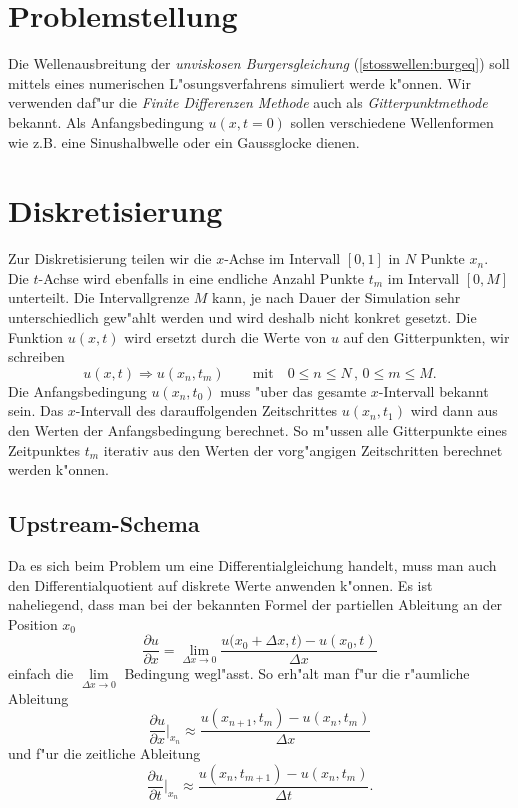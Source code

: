 \begin{refsection}
\section{Problemstellung}
Die Wellenausbreitung der \textit{unviskosen Burgersgleichung}
(\ref{stosswellen:burgeq}) soll mittels eines numerischen
L"osungsverfahrens simuliert werde k"onnen. Wir verwenden daf"ur die
\textit{Finite Differenzen Methode} auch als \textit{Gitterpunktmethode}
bekannt. Als Anfangsbedingung $u(x,t\!=\!0)$ sollen verschiedene
Wellenformen wie z.B. eine Sinushalbwelle oder ein Gaussglocke dienen. 

\section{Diskretisierung}
Zur Diskretisierung teilen wir die $x$-Achse im Intervall $[0,1]$ in $N$
Punkte $x_{n}$. Die $t$-Achse wird ebenfalls in eine endliche Anzahl
Punkte $t_{m}$ im Intervall $[0,M]$ unterteilt. Die Intervallgrenze
$M$ kann, je nach Dauer der Simulation sehr unterschiedlich gew"ahlt
werden und wird deshalb nicht konkret gesetzt. Die Funktion $u(x,t)$
wird ersetzt durch die Werte von $u$ auf den Gitterpunkten, wir schreiben
\begin{equation*}
	u(x,t) \Rightarrow u(x_{n},t_{m}) \qquad \text{mit} \quad 0 \leq n \leq N \, , \, 0\leq m \leq M.
\end{equation*}
Die Anfangsbedingung $u(x_n,t_0)$ muss "uber das gesamte $x$-Intervall
bekannt sein. Das $x$-Intervall des darauffolgenden Zeitschrittes
$u(x_n,t_1)$ wird dann aus den Werten der Anfangsbedingung berechnet. So
m"ussen alle Gitterpunkte eines Zeitpunktes $t_m$ iterativ aus den Werten
der vorg"angigen Zeitschritten berechnet werden k"onnen. 

\subsection{Upstream-Schema}
Da es sich beim Problem um eine Differentialgleichung handelt, muss man
auch den Differentialquotient auf diskrete Werte anwenden k"onnen. Es ist
naheliegend, dass man bei der bekannten Formel der partiellen Ableitung
an der Position $x_{0}$
\begin{equation}
	\frac{\partial u}{\partial x} = \lim\limits_{\Delta x \to 0} \frac{{u(x_{0}}\!+\!\Delta x,t)-u(x_{0},t)}{\Delta x}
\end{equation}
einfach die $\lim\limits_{\Delta x \to 0}$ Bedingung wegl"asst. So erh"alt man f"ur die r"aumliche Ableitung
\begin{equation}
	\frac{\partial u}{\partial x} \Bigg|_{x_{n}} \approx \frac{u(x_{n\!+\!1},t_{m})-u(x_{n},t_{m})}{\Delta x}
	\label{stosswellen:upsteamort}
\end{equation}
und f"ur die zeitliche Ableitung
\begin{equation}
	\frac{\partial u}{\partial t} \Bigg|_{x_{n}} \approx \frac{u(x_{n},t_{m\!+\!1})-u(x_{n},t_{m})}{\Delta t}.
	\label{stosswellen:eulerschritt}
\end{equation}


\end{refsection}

